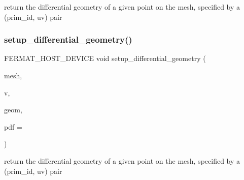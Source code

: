 return the differential geometry of a given point on the mesh, specified by a (prim\+\_\+id, uv) pair \mbox{\label{group___mesh_module_gaf14996897cb3e5f1782571fa40736a4a}} 
\subsubsection{\texorpdfstring{setup\+\_\+differential\+\_\+geometry()}{setup\_differential\_geometry()}\hspace{0.1cm}{\footnotesize\ttfamily [2/2]}}
{\footnotesize\ttfamily F\+E\+R\+M\+A\+T\+\_\+\+H\+O\+S\+T\+\_\+\+D\+E\+V\+I\+CE void setup\+\_\+differential\+\_\+geometry (\begin{DoxyParamCaption}\item[{const \hyperlink{struct_mesh_view}{Mesh\+View} \&}]{mesh,  }\item[{const \hyperlink{struct_vertex_geometry_id}{Vertex\+Geometry\+Id}}]{v,  }\item[{\hyperlink{struct_vertex_geometry}{Vertex\+Geometry} $\ast$}]{geom,  }\item[{float $\ast$}]{pdf = {} }\end{DoxyParamCaption})\hspace{0.3cm}{\ttfamily [inline]}}

return the differential geometry of a given point on the mesh, specified by a (prim\+\_\+id, uv) pair 